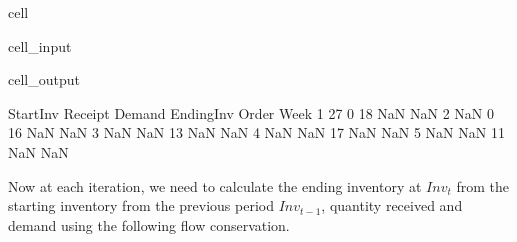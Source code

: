 \documentclass[letterpaper,10pt,english]{jupyterBook}
\begin{document}
\begin{sphinxuseclass}{cell}\begin{sphinxVerbatimInput}

\begin{sphinxuseclass}{cell_input}
\begin{sphinxVerbatim}[commandchars=\\\{\}]
\PYG{p}{[} \PYG{p}{]}  
    
    \PYG{p}{[}\PYG{p}{]}

\PYG{p}{[}\PYG{p}{]}  
 
\end{sphinxVerbatim}

\end{sphinxuseclass}\end{sphinxVerbatimInput}
\begin{sphinxVerbatimOutput}

\begin{sphinxuseclass}{cell_output}
\begin{sphinxVerbatim}[commandchars=\\\{\}]
     Start\PYGZus{}Inv Receipt  Demand Ending\PYGZus{}Inv Order
Week                                           
1           27       0      18        NaN   NaN
2          NaN       0      16        NaN   NaN
3          NaN     NaN      13        NaN   NaN
4          NaN     NaN      17        NaN   NaN
5          NaN     NaN      11        NaN   NaN
\end{sphinxVerbatim}

\end{sphinxuseclass}\end{sphinxVerbatimOutput}

\end{sphinxuseclass}
\sphinxAtStartPar
Now at each iteration, we need to calculate the ending inventory at \(Inv_t\) from the starting inventory from the previous period \(Inv_{t-1}\), quantity received and demand using the following flow conservation.
\end{document}
